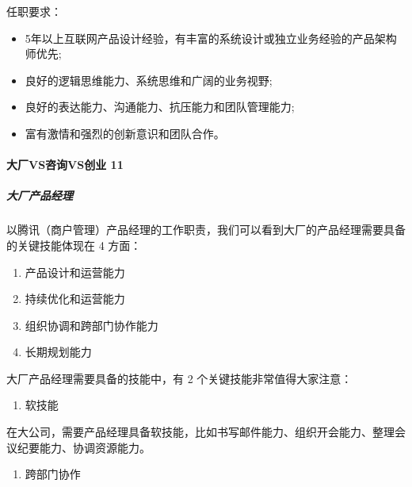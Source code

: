 \documentclass[letterpaper,11pt,english]{sphinxmanual}
\begin{document}
任职要求：
\begin{itemize}
\item {} 
5年以上互联网产品设计经验，有丰富的系统设计或独立业务经验的产品架构师优先;

\item {} 
良好的逻辑思维能力、系统思维和广阔的业务视野;

\item {} 
良好的表达能力、沟通能力、抗压能力和团队管理能力;

\item {} 
富有激情和强烈的创新意识和团队合作。

\end{itemize}


\paragraph{大厂VS咨询VS创业 11\sphinxfootnotemark[155]}
\label{\detokenize{chapter_introduction/PM:vsvs-11}}%
\begin{footnotetext}[155]\sphinxAtStartFootnote
{}
%
\end{footnotetext}\ignorespaces 

\subparagraph{大厂产品经理}
\label{\detokenize{chapter_introduction/PM:id41}}
以腾讯（商户管理）产品经理的工作职责，我们可以看到大厂的产品经理需要具备的关键技能体现在
4 方面：
\begin{enumerate}
%
\item {} 
产品设计和运营能力

\item {} 
持续优化和运营能力

\item {} 
组织协调和跨部门协作能力

\item {} 
长期规划能力

\end{enumerate}

大厂产品经理需要具备的技能中，有 2 个关键技能非常值得大家注意：
\begin{enumerate}
%
\item {} 
软技能

\end{enumerate}

在大公司，需要产品经理具备软技能，比如书写邮件能力、组织开会能力、整理会议纪要能力、协调资源能力。
\begin{enumerate}
%
\setcounter{enumi}{1}
\item {} 
跨部门协作

\end{enumerate}
\end{document}
